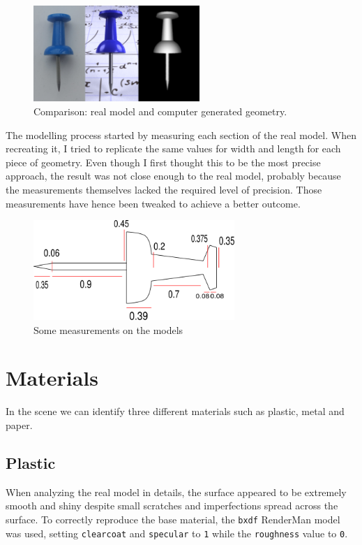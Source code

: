 \documentclass[tog]{acmsiggraph}
\begin{document}
\begin{figure}[h]
  \centering
  \includegraphics[width=6.3cm]{images/modelling.png}
  \caption{Comparison: real model and computer generated geometry.}
  \label{fig:modelling}
\end{figure}

\vspace{1.0cm}
The modelling process started by measuring each section of the real model. When recreating it, I tried to replicate the same values for width and length for each piece of geometry. Even though I first thought this to be the most precise approach, the result was not close enough to the real model, probably because the measurements themselves lacked the required level of precision.
Those measurements have hence been tweaked to achieve a better outcome.

\begin{figure}[h!]
  \centering
  \includegraphics[width=3.0in]{images/measurements.png}
  \caption{Some measurements on the models}
  \label{fig:measurements}
\end{figure}

\newpage
\section{Materials}

In the scene we can identify three different materials such as plastic, metal and paper.

\subsection{Plastic}
When analyzing the real model in details, the surface appeared to be extremely smooth and shiny despite small scratches and imperfections spread across the surface. To correctly reproduce the base material, the \texttt{bxdf} RenderMan model was used, setting \texttt{clearcoat} and \texttt{specular} to \texttt{1} while the \texttt{roughness} value to \texttt{0}.
\end{document}
